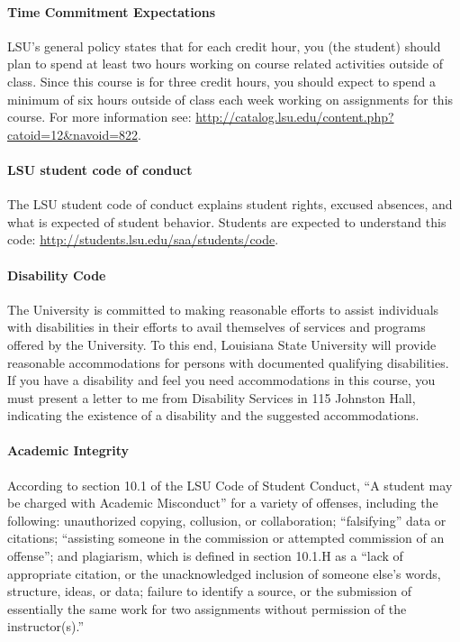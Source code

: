 \documentclass[11pt,article,oneside]{memoir}
\begin{document}
\paragraph{Time Commitment Expectations}
LSU's general policy states that for each credit hour, you (the student) should plan to
spend at least two hours working on course related activities outside of class. Since this course is for three credit hours, you should expect to spend a minimum of six hours outside of class each week working on assignments for this course. For more information see: 
\url{http://catalog.lsu.edu/content.php?catoid=12&navoid=822}.

\paragraph{LSU student code of conduct}
The LSU student code of conduct explains student rights, excused absences, and what is expected of student behavior. Students are expected to understand this code:  \url{http://students.lsu.edu/saa/students/code}.


\paragraph{Disability Code}
The University is committed to making reasonable efforts to assist individuals with disabilities in
their efforts to avail themselves of services and programs offered by the University. To this end,
Louisiana State University will provide reasonable accommodations for persons with
documented qualifying disabilities. If you have a disability and feel you need accommodations in
this course, you must present a letter to me from Disability Services in 115 Johnston Hall,
indicating the existence of a disability and the suggested accommodations.

\paragraph{Academic Integrity}
According to section 10.1 of the LSU Code of Student Conduct, ``A student may be charged with Academic Misconduct'' for a variety of offenses, including the following: unauthorized copying, collusion, or collaboration; ``falsifying'' data or citations; ``assisting someone in the commission or attempted commission of an offense''; and plagiarism, which is defined in section 10.1.H as a ``lack of appropriate citation, or the unacknowledged inclusion of someone else's words, structure, ideas, or data; failure to identify a source, or the submission of essentially the same work for two assignments without permission of the instructor(s).''
\end{document}
